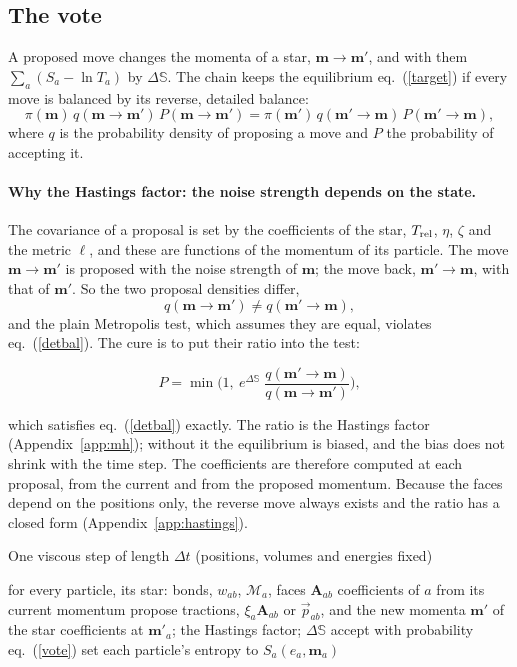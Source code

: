 \documentclass[11pt,aps,preprint,nofootinbib,superscriptaddress,tightenlines]{revtex4-2}
\def\st{\begin{equation}}
\def\stp{\end{equation}}
\def\Eq#1{eq.~(\ref{#1})}
\def\App#1{Appendix~\ref{#1}}
\let\oldparagraph\paragraph
\renewcommand{\paragraph}{\par\bigskip\oldparagraph}
\begin{document}
\subsection{The vote}

A proposed move changes the momenta of a star, $\bm m\to\bm m'$, and with them $\sum_a(S_a-\ln T_a)$ by $\Delta\mathbb S$.  The chain keeps the equilibrium
\Eq{target} if every move is balanced by its reverse, detailed balance:
\st
\pi(\bm m)\,q(\bm m\to\bm m')\,P(\bm m\to\bm m')=\pi(\bm m')\,q(\bm m'\to\bm m)\,P(\bm m'\to\bm m),
\label{detbal}
\stp
where $q$ is the probability density of proposing a move and $P$ the probability of accepting it.

\paragraph{Why the Hastings factor: the noise strength depends on the state.}  The covariance of a proposal is set by the coefficients of the
star, $T_{\rm rel}$, $\eta$, $\zeta$ and the metric $\ell$, and these are functions of the momentum of its particle.  The move $\bm m\to\bm m'$ is proposed with
the noise strength of $\bm m$; the move back, $\bm m'\to\bm m$, with that of $\bm m'$.  So the two proposal densities differ,
\st
q(\bm m\to\bm m')\neq q(\bm m'\to\bm m),
\stp
and the plain Metropolis test, which assumes they are equal, violates \Eq{detbal}.  The cure is to put their ratio into the test:
\begin{keyeq}
\st
P=\min\Big(1,\ e^{\Delta\mathbb S}\;\frac{q(\bm m'\to\bm m)}{q(\bm m\to\bm m')}\Big),
\label{vote}
\stp
\end{keyeq}
which satisfies \Eq{detbal} exactly.  The ratio is the Hastings factor (\App{app:mh}); without it the equilibrium is biased, and the bias does
not shrink with the time step.  The coefficients are therefore computed at each proposal, from the current and from the proposed momentum.
Because the faces depend on the positions only, the reverse move always exists and the ratio has a closed form (\App{app:hastings}).

\begin{algobox}{One viscous step of length $\Delta t$ (positions, volumes and energies fixed)}
\begin{algorithmic}[1]
\State for every particle, its star: bonds, $w_{ab}$, $\mathcal M_a$, faces $\bm A_{ab}$ 
   \Comment{parallel: \App{app:sweeps}}
    \State coefficients of $a$ from its current momentum
    \State propose tractions, $\xi_a\bm A_{ab}$ or $\vec p_{ab}$, and the new momenta $\bm m'$ of the star
    \State coefficients at $\bm m'_a$; the Hastings factor; $\Delta\mathbb S$
    \State accept with probability \Eq{vote}
  \EndFor
\EndFor
\State set each particle's entropy to $S_a(e_a,\bm m_a)$
\end{algorithmic}
\end{algobox}
\end{document}
